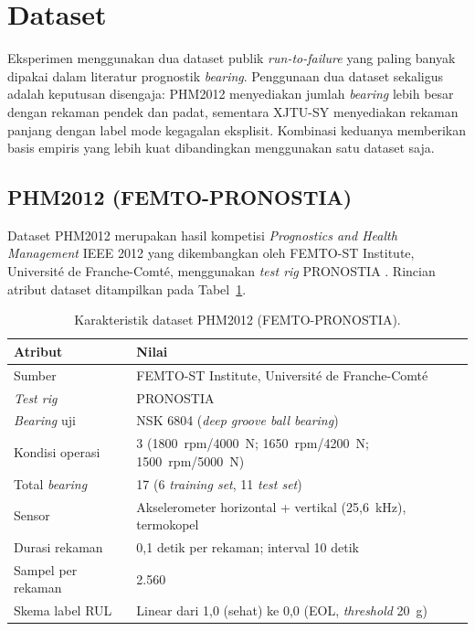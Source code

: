 \section{Dataset}
\label{sec:bab4_dataset}

Eksperimen menggunakan dua dataset publik \emph{run-to-failure} yang
paling banyak dipakai dalam literatur prognostik \emph{bearing}.
Penggunaan dua dataset sekaligus adalah keputusan disengaja: PHM2012
menyediakan jumlah \emph{bearing} lebih besar dengan rekaman pendek dan padat,
sementara XJTU-SY menyediakan rekaman panjang dengan label mode kegagalan
eksplisit.
Kombinasi keduanya memberikan basis empiris yang lebih kuat dibandingkan
menggunakan satu dataset saja.

\subsection{PHM2012 (FEMTO-PRONOSTIA)}
\label{subsec:bab4_phm2012}

Dataset PHM2012 merupakan hasil kompetisi \emph{Prognostics and Health
Management} IEEE 2012 yang dikembangkan oleh FEMTO-ST Institute,
Université de Franche-Comté, menggunakan \emph{test rig} PRONOSTIA
.
Rincian atribut dataset ditampilkan pada Tabel~\ref{tab:bab4_phm2012}.

\begin{table}[ht]
\centering
\caption{Karakteristik dataset PHM2012 (FEMTO-PRONOSTIA).}
\label{tab:bab4_phm2012}
\small
\begin{tabular}{@{}ll@{}}
\toprule
\textbf{Atribut} & \textbf{Nilai} \\
\midrule
Sumber                  & FEMTO-ST Institute, Université de Franche-Comté \\
\emph{Test rig}         & PRONOSTIA \\
\emph{Bearing} uji            & NSK 6804 (\emph{deep groove ball bearing}) \\
Kondisi operasi         & 3 (1800~rpm/4000~N; 1650~rpm/4200~N; 1500~rpm/5000~N) \\
Total \emph{bearing}          & 17 (6 \emph{training set}, 11 \emph{test set}) \\
Sensor                  & Akselerometer horizontal + vertikal (25{,}6~kHz), termokopel \\
Durasi rekaman          & 0{,}1 detik per rekaman; interval 10 detik \\
Sampel per rekaman      & 2.560 \\
Skema label RUL         & Linear dari 1{,}0 (sehat) ke 0{,}0 (EOL, \emph{threshold} 20~g) \\
\bottomrule
\end{tabular}
\end{table}

